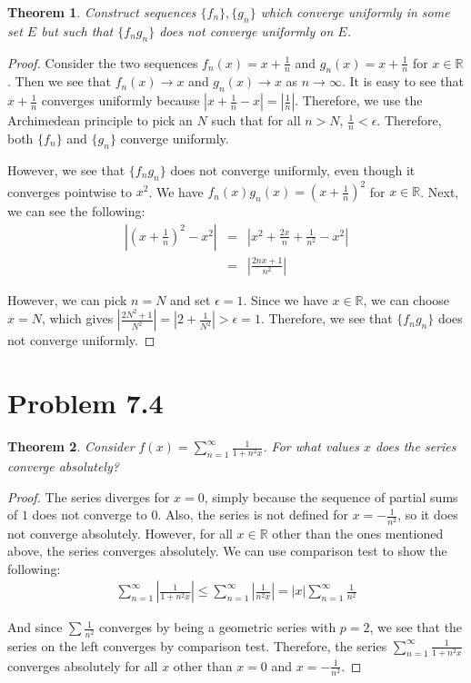 \documentclass[psamsfonts]{amsart}
\newtheorem{thm}{Theorem}[section]
\theoremstyle{definition}
\theoremstyle{remark}
\numberwithin{equation}{section}
\begin{document}
\begin{thm}
Construct sequences $\{ f_n\}, \{g_n\}$ which converge uniformly in some set $E$ but such that $\{f_n g_n \}$ does not converge uniformly on $E$. 
\end{thm}

\begin{proof}
Consider the two sequences $f_n(x) = x + \frac{1}{n}$ and $g_n(x) = x + \frac{1}{n}$ for $x \in \mathbb{R}$. Then we see that $f_n(x) \to x$ and $g_n(x) \to x$ as $n \to \infty$. It is easy to see that $x+ \frac{1}{n}$ converges uniformly because $|x + \frac{1}{n} - x| = |\frac{1}{n}|$. Therefore, we use the Archimedean principle to pick an $N$ such that for all $n > N$, $\frac{1}{n} < \epsilon$. Therefore, both $\{f_n\}$ and $\{g_n\}$ converge uniformly.

However, we see that $\{f_n g_n \}$ does not converge uniformly, even though it converges pointwise to $x^2$. We have $f_n (x) g_n (x) = (x + \frac{1}{n})^2$ for $x \in \mathbb{R}$. Next, we can see the following:
\begin{eqnarray}
\left| \left(x + \frac{1}{n}\right)^2 - x^2 \right| &=& \left|x^2 + \frac{2x}{n} + \frac{1}{n^2} - x^2 \right| \\
&=& \left|\frac{2nx + 1}{n^2} \right|
\end{eqnarray}

However, we can pick $n = N$ and set $\epsilon = 1$. Since  we have $x \in \mathbb{R}$, we can choose $x = N$, which gives $|\frac{2N^2 + 1}{N^2}| = |2 + \frac{1}{N^2} | > \epsilon = 1$. Therefore, we see that $\{ f_n g_n \}$ does not converge uniformly.
\end{proof}

\section{Problem 7.4}

\begin{thm}
Consider $f(x) = \sum_{n=1}^\infty \frac{1}{1+n^2 x}$. For what values $x$ does the series converge absolutely?
\end{thm}

\begin{proof}
The series diverges for $x = 0$, simply because the sequence of partial sums of $1$ does not converge to $0$. Also, the series is not defined for $x = -\frac{1}{n^2}$, so it does not converge absolutely. However, for all $x \in \mathbb{R}$ other than the ones mentioned above, the series converges absolutely. We can use comparison test to show the following:
\begin{eqnarray}
\sum_{n=1}^\infty \left| \frac{1}{1+n^2 x} \right| \leq \sum_{n=1}^\infty \left| \frac{1}{n^2 x} \right| = |x| \sum_{n=1}^\infty \frac{1}{n^2}
\end{eqnarray}

And since $\sum \frac{1}{n^2}$ converges by being a geometric series with $p = 2$, we see that the series on the left converges by comparison test. Therefore, the series $\sum_{n=1}^\infty \frac{1}{1+n^2 x}$ converges absolutely for all $x$ other than $x=0$ and $x = - \frac{1}{n^2}$. 
\end{proof}
\end{document}
